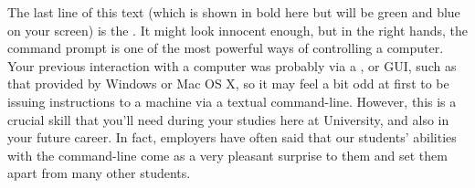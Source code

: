 %

The last line of this text (which is shown in bold here but will be green and blue on your screen) is the . It might look innocent enough, but in the right hands, the command prompt is one of the most powerful ways of controlling a computer. Your previous interaction with a computer was probably via  a , or GUI, such as that provided by Windows or Mac OS X, so  it may feel a bit odd at first to be issuing instructions to a machine via a textual command-line. However, this is a crucial skill that you'll need during your studies here at University, and also in your future career. In fact, employers have often said that our students' abilities with the command-line come as a very pleasant surprise to them and set them apart from many other students.



